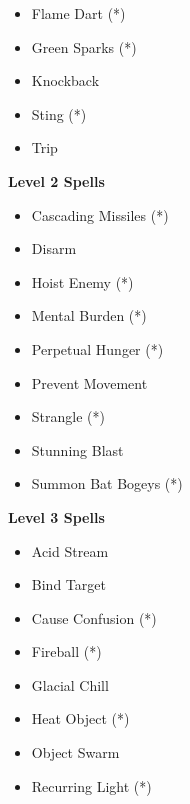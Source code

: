 \begin{multicols}{4}
{\begin{itemize}[itemsep=0em]
\item Flame Dart (*) 

\item Green Sparks (*) 

\item Knockback

\item Sting (*) 

\item Trip


\end{itemize}
\textbf{Level 2 Spells}
\begin{itemize}[itemsep=0em]
\renewcommand\labelitemi{-}
\item Cascading Missiles (*) 

\item Disarm

\item Hoist Enemy (*) 

\item Mental Burden (*) 

\item Perpetual Hunger (*) 

\item Prevent Movement

\item Strangle (*) 

\item Stunning Blast

\item Summon Bat Bogeys (*) 


\end{itemize}
\textbf{Level 3 Spells}
\begin{itemize}[itemsep=0em]
\renewcommand\labelitemi{-}
\item Acid Stream

\item Bind Target

\item Cause Confusion (*) 

\item Fireball (*) 

\item Glacial Chill

\item Heat Object (*) 

\item Object Swarm

\item Recurring Light (*) 


\end{itemize}}
\end{multicols}
